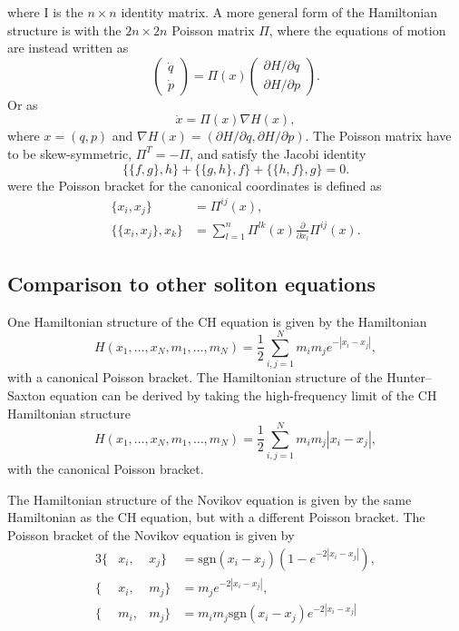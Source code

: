 \documentclass[english,master]{liumaiex}
\theoremstyle{plain}
\theoremstyle{definition}
\newcommand{\sgn}{\text{sgn}}
\begin{document}
%
where I is the $n \times n$ identity matrix. A more general form of the Hamiltonian structure is with the $2n \times 2n$ Poisson matrix $\Pi$, where the equations of motion are instead written as
%
\begin{equation}
\begin{pmatrix}
	\dot{q} \\
	\dot{p}
\end{pmatrix} =
\Pi(x)
\begin{pmatrix}
	\partial H / \partial q \\
	\partial H / \partial p
\end{pmatrix}.
\end{equation}
%
Or as
%
\begin{equation}
	\dot{x} = \Pi(x) \nabla H(x),
\end{equation}
%
where $x = (q,p)$ and $\nabla H(x) = (\partial H / \partial q, \partial H / \partial p)$. The Poisson matrix have to be skew-symmetric, $\Pi^T = -\Pi$, and satisfy the Jacobi identity
\begin{equation}
	\{\{f,g\},h\} + \{\{g,h\},f\} + \{\{h,f\},g\} = 0.
\end{equation}
%
were the Poisson bracket for the canonical coordinates is defined as
%
\begin{align}
	\{x_i, x_j\} &= \Pi^{ij}(x), \\
	\{\{x_i, x_j\}, x_k\} &= \sum_{l=1}^n \Pi^{lk}(x) \frac{\partial}{\partial x_l} \Pi^{ij}(x).
\end{align}

\subsection{Comparison to other soliton equations}

One Hamiltonian structure of the CH equation is given by the Hamiltonian
\begin{equation}
	H(x_1, \dots, x_N, m_1, \dots, m_N) = \frac{1}{2} \sum_{i,j = 1}^{N} m_i m_j e^{-|x_i - x_j|},
\end{equation}
with a canonical Poisson bracket. The Hamiltonian structure of the Hunter--Saxton equation can be derived by taking the high-frequency limit of the CH Hamiltonian structure
\begin{equation}
	H(x_1, \dots, x_N, m_1, \dots, m_N) = \frac{1}{2} \sum_{i,j = 1}^{N} m_i m_j |x_i - x_j|,
\end{equation}
with the canonical Poisson bracket.

The Hamiltonian structure of the Novikov equation is given by the same Hamiltonian as the CH equation, but with a different Poisson bracket. The Poisson bracket of the Novikov equation is given by
\begin{alignat}{3}
	\{&x_i, &x_j\} &= \sgn(x_i - x_j)(1 - e^{-2|x_i - x_j|}), \\
	\{&x_i, &m_j\} &= m_j e^{-2|x_i - x_j|}, \\
	\{&m_i, &m_j\} &= m_i m_j \sgn(x_i - x_j)e^{-2|x_i - x_j|}
\end{alignat}
\end{document}
